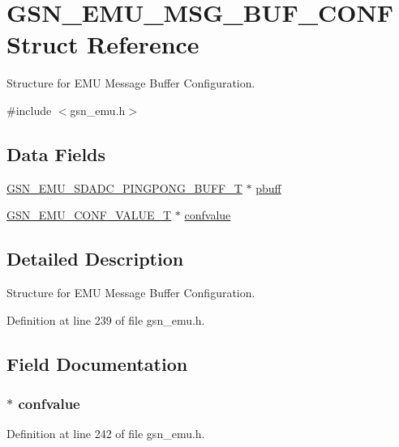 \hypertarget{a00063}{
\section{GSN\_\-EMU\_\-MSG\_\-BUF\_\-CONF Struct Reference}
\label{a00063}
}


Structure for EMU Message Buffer Configuration.  




{\ttfamily \#include $<$gsn\_\-emu.h$>$}

\subsection*{Data Fields}
\begin{DoxyCompactItemize}
\item 
\hyperlink{a00067}{GSN\_\-EMU\_\-SDADC\_\-PINGPONG\_\-BUFF\_\-T} $\ast$ \hyperlink{a00063_a994ae3a32b81cbe8604948bdb4ec2c9d}{pbuff}
\item 
\hyperlink{a00058}{GSN\_\-EMU\_\-CONF\_\-VALUE\_\-T} $\ast$ \hyperlink{a00063_a2fc01b37fc7ed6777d21524796f8db43}{confvalue}
\end{DoxyCompactItemize}


\subsection{Detailed Description}
Structure for EMU Message Buffer Configuration. 

Definition at line 239 of file gsn\_\-emu.h.



\subsection{Field Documentation}
\hypertarget{a00063_a2fc01b37fc7ed6777d21524796f8db43}{
\subsubsection[{confvalue}]{$\ast$ {\bf confvalue}}}
\label{a00063_a2fc01b37fc7ed6777d21524796f8db43}


Definition at line 242 of file gsn\_\-emu.h.

